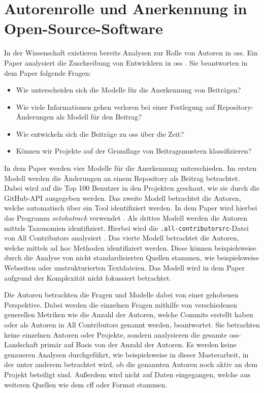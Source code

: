 \section{Autorenrolle und Anerkennung in Open-Source-Software}
\label{sec:autorenrolle-oss}
In der Wissenschaft existieren bereits Analysen zur Rolle von Autoren in \gls{oss}.
Ein Paper analysiert die Zuschreibung von Entwicklern in \gls{oss} \autocite{young_which_2021}.
Sie beantworten in dem Paper folgende Fragen:

\begin{itemize}
  \item Wie unterscheiden sich die Modelle für die Anerkennung von Beiträgen?
  \item Wie viele Informationen gehen verloren bei einer Festlegung auf Repository-Änderungen als Modell für den Beitrag?
  \item Wie entwickeln sich die Beiträge zu \gls{oss} über die Zeit?
  \item Können wir Projekte auf der Grundlage von Beitragsmustern klassifizieren?
\end{itemize}

In dem Paper werden vier Modelle für die Anerkennung unterschieden.
Im ersten Modell werden die Änderungen an einem Repository als Beitrag betrachtet.
Dabei wird auf die Top 100 Benutzer in den Projekten geschaut, wie sie durch die GitHub-API ausgegeben werden.
Das zweite Modell betrachtet die Autoren, welche automatisch über ein Tool identifiziert werden.
In dem Paper wird hierbei das Programm \emph{octohatrack} verwendet \autocites{young_which_2021}{mclaughlin_octohatrack_2020}.
Als drittes Modell werden die Autoren mittels Taxonomien identifiziert.
Hierbei wird die \texttt{.all-contributorsrc}-Datei von \glqq All Contributors\grqq{} analysiert \autocites{young_which_2021}{bolam_recognize_2024}.
Das vierte Modell betrachtet die Autoren, welche mittels ad hoc Methoden identifiziert werden.
Diese können beispielsweise durch die Analyse von nicht standardisierten Quellen stammen, wie beispielsweise Webseiten oder unstrukturierten Textdateien.
Das Modell wird in dem Paper aufgrund der Komplexität nicht fokussiert betrachtet.

Die Autoren betrachten die Fragen und Modelle dabei von einer gehobenen Perspektive.
Dabei werden die einzelnen Fragen mithilfe von verschiedenen generellen Metriken wie die Anzahl der Autoren, welche Commits erstellt haben oder als Autoren in \glqq All Contributors\grqq{} genannt werden, beantwortet.
Sie betrachten keine einzelnen Autoren oder Projekte, sondern analysieren die gesamte \gls{oss}-Landschaft primär auf Basis von der Anzahl der Autoren.
Es werden keine genaueren Analysen durchgeführt, wie beispielsweise in dieser Masterarbeit, in der unter anderem betrachtet wird, ob die genannten Autoren noch aktiv an dem Projekt beteiligt sind.
Außerdem wird nicht auf Daten eingegangen, welche aus weiteren Quellen wie dem \gls{cff} oder  Format stammen.
